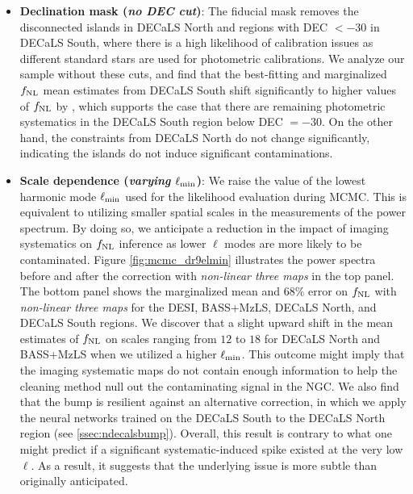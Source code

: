\begin{itemize}[itemindent=*]
\item \textbf{Declination mask (\textit{no DEC cut})}: The fiducial mask removes the disconnected islands in DECaLS North and regions with DEC $<-30$ in DECaLS South, where there is a high likelihood of calibration issues as different standard stars are used for photometric calibrations. We analyze our sample without these cuts, and find that the best-fitting and marginalized $f_{\rm NL}$ mean estimates from DECaLS South shift significantly to higher values of $f_{\rm NL}$ by , which supports the case that there are remaining photometric systematics in the DECaLS South region below DEC $=-30$. On the other hand, the constraints from DECaLS North do not change significantly, indicating the islands do not induce significant contaminations.

\item \textbf{Scale dependence (\textit{varying $\ell_{\rm min}$})}: We raise the value of the lowest harmonic mode $\ell_{\rm min}$ used for the likelihood evaluation during MCMC. This is equivalent to utilizing smaller spatial scales in the measurements of the power spectrum. By doing so, we anticipate a reduction in the impact of imaging systematics on $f_{\rm NL}$ inference as lower $\ell$ modes are more likely to be contaminated. Figure \ref{fig:mcmc_dr9elmin} illustrates the power spectra before and after the correction with \textit{non-linear three maps} in the top panel. The bottom panel shows the marginalized mean and $68\%$ error on $f_{\rm NL}$ with \textit{non-linear three maps} for the DESI, BASS+MzLS, DECaLS North, and DECaLS South regions. We discover that a slight upward shift in the mean estimates of $f_{\rm NL}$ on scales ranging from $12$ to $18$ for DECaLS North and BASS+MzLS when we utilized a higher $\ell_{\rm min}$. This outcome might imply that the imaging systematic maps do not contain enough information to help the cleaning method null out the contaminating signal in the NGC. We also find that the bump is resilient against an alternative correction, in which we apply the neural networks trained on the DECaLS South to the DECaLS North region (see \ref{ssec:ndecalsbump}). Overall, this result is contrary to what one might predict if a significant systematic-induced spike existed at the very low $\ell$. As a result, it suggests that the underlying issue is more subtle than originally anticipated.
\end{itemize}



